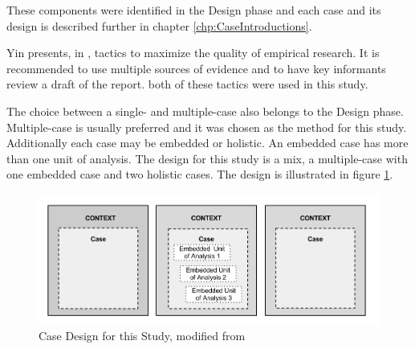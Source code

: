 These components were identified in the Design phase and each case and its design is described further in chapter \ref{chp:CaseIntroductions}.

Yin presents, in \cite{CaseStudyResearch}, tactics to maximize the quality of empirical research. It is recommended to use multiple sources of evidence and to have key informants review a draft of the report. both of these tactics were used in this study. %



The choice between a single- and multiple-case also belongs to the Design phase. Multiple-case is usually preferred \cite{CaseStudyResearch} and it was chosen as the method for this study. Additionally each case may be embedded or holistic. An embedded case has more than one unit of analysis. The design for this study is a mix, a multiple-case with one embedded case and two holistic cases. %
The design is illustrated in figure \ref{fig:caseDesign}.

\begin{figure}[ht]
\hspace{-0.28cm}\includegraphics[scale=0.375]{caseStructure.png}
\caption[Case Design for this Study]{Case Design for this Study, modified from \cite{CaseStudyResearch}}
\label{fig:caseDesign}
\end{figure}

